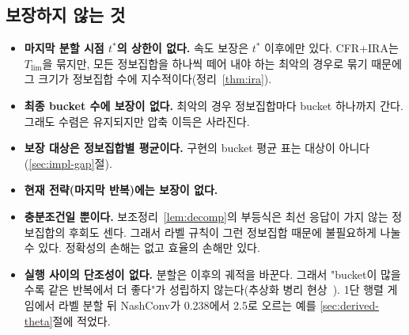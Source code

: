 \subsection{보장하지 않는 것}\label{sec:theory-limits}
\begin{itemize}
  \item \textbf{마지막 분할 시점 $t^*$의 상한이 없다.} 속도 보장은 $t^*$ 이후에만 있다.
    CFR+IRA는 $T_{\lim}$을 묶지만, 모든 정보집합을 하나씩 떼어 내야 하는 최악의 경우로 묶기 때문에 그 크기가 정보집합 수에 지수적이다(정리~\ref{thm:ira}).
  \item \textbf{최종 bucket 수에 보장이 없다.} 최악의 경우 정보집합마다 bucket 하나까지 간다. 그래도 수렴은 유지되지만 압축 이득은 사라진다.
  \item \textbf{보장 대상은 정보집합별 평균이다.} 구현의 bucket 평균 표는 대상이 아니다(\ref{sec:impl-gap}절).
  \item \textbf{현재 전략(마지막 반복)에는 보장이 없다.}
  \item \textbf{충분조건일 뿐이다.} 보조정리~\ref{lem:decomp}의 부등식은 최선 응답이 가지 않는 정보집합의 후회도 센다. 그래서 라벨 규칙이 그런 정보집합 때문에 불필요하게 나눌 수 있다. 정확성의 손해는 없고 효율의 손해만 있다.
  \item \textbf{실행 사이의 단조성이 없다.} 분할은 이후의 궤적을 바꾼다. 그래서 "bucket이 많을수록 같은 반복에서 더 좋다"가 성립하지 않는다(추상화 병리 현상~\citep{waugh2009abstraction}).
    1단 행렬 게임에서 라벨 분할 뒤 NashConv가 0.238에서 2.5로 오르는 예를 \ref{sec:derived-theta}절에 적었다.
\end{itemize}
